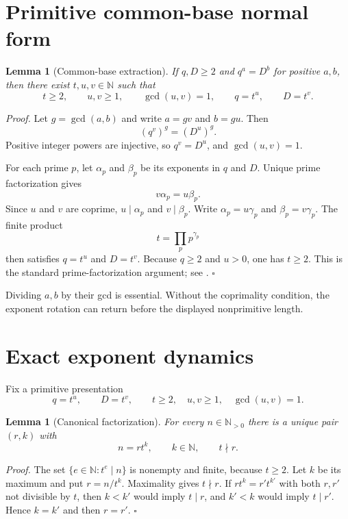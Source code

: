 \documentclass[11pt,letterpaper]{article}
\newcommand{\N}{\mathbb{N}}
\newtheorem{lemma}[theorem]{Lemma}
\newenvironment{proof}{\noindent\textit{Proof.}}{\hfill\(\square\)}
\begin{document}
\section{Primitive common-base normal form}

\begin{lemma}[Common-base extraction]
\label{lem:normal-form}
If $q,D\geq2$ and $q^a=D^b$ for positive $a,b$, then there exist
$t,u,v\in\N$ such that
\[
 t\geq2,\qquad u,v\geq1,\qquad \gcd(u,v)=1,
 \qquad q=t^u,\qquad D=t^v.
\]
\end{lemma}

\begin{proof}
Let $g=\gcd(a,b)$ and write $a=gv$ and $b=gu$.  Then
\[
 (q^v)^g=(D^u)^g.
\]
Positive integer powers are injective, so $q^v=D^u$, and
$\gcd(u,v)=1$.

For each prime $p$, let $\alpha_p$ and $\beta_p$ be its exponents in $q$ and
$D$.  Unique prime factorization gives
\[
 v\alpha_p=u\beta_p.
\]
Since $u$ and $v$ are coprime, $u\mid\alpha_p$ and $v\mid\beta_p$.  Write
$\alpha_p=u\gamma_p$ and $\beta_p=v\gamma_p$.  The finite product
\[
 t=\prod_p p^{\gamma_p}
\]
then satisfies $q=t^u$ and $D=t^v$.  Because $q\geq2$ and $u>0$, one has
$t\geq2$.  This is the standard prime-factorization argument; see
\cite[Chapter I]{HardyWright08}.
\end{proof}

Dividing $a,b$ by their gcd is essential.  Without the coprimality condition,
the exponent rotation can return before the displayed nonprimitive length.

\section{Exact exponent dynamics}

Fix a primitive presentation
\[
 q=t^u,\qquad D=t^v,
 \qquad t\geq2,\quad u,v\geq1,\quad\gcd(u,v)=1.
\]

\begin{lemma}[Canonical factorization]
\label{lem:canonical-factorization}
For every $n\in\N_{>0}$ there is a unique pair $(r,k)$ with
\[
 n=rt^k,\qquad k\in\N,\qquad t\nmid r.
\]
\end{lemma}

\begin{proof}
The set $\{e\in\N:t^e\mid n\}$ is nonempty and finite, because $t\geq2$.
Let $k$ be its maximum and put $r=n/t^k$.  Maximality gives $t\nmid r$.
If $rt^k=r't^{k'}$ with both $r,r'$ not divisible by $t$, then $k<k'$
would imply $t\mid r$, and $k'<k$ would imply $t\mid r'$.  Hence $k=k'$
and then $r=r'$.
\end{proof}
\end{document}
